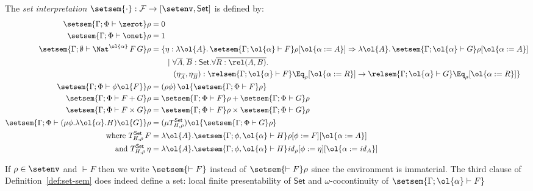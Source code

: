 \documentclass{lmcs}
\theoremstyle{plain}\newtheorem{satz}[thm]{Satz}
\newcommand{\F}{\mathcal{F}}
\newcommand{\set}{\mathsf{Set}}
\renewcommand{\id}{\mathit{id}}
\begin{document}
\begin{defi}\label{def:set-sem}
The {\em set interpretation} $\setsem{\cdot} : \F \to [\setenv, \set]$
is defined by:
\begin{align*}
  \setsem{\Gamma;\Phi \vdash \zerot}\rho &= 0\\
  \setsem{\Gamma;\Phi \vdash \onet}\rho &= 1\\
  \setsem{\Gamma; \emptyset
    \vdash \Nat^{\ol{\alpha}}
    \,F\,G}\rho &= \{\eta : \lambda \ol{A}. \,\setsem{\Gamma;
    \ol{\alpha} \vdash
    F}\rho[\ol{\alpha := A}] 
      \Rightarrow \lambda \ol{A}.\,\setsem{\Gamma; 
        \ol{\alpha} \vdash G}\rho[\ol{\alpha := A}] \\ 
      &\hspace{0.3in}|~\forall \overline{A}, \overline{B} :
      \set. \forall \overline{R : \rel(A, B)}.\\ 
      &\hspace{0.4in}(\eta_{\overline{A}}, \eta_{\overline{B}})
      : \relsem{\Gamma; \ol{\alpha} \vdash F}\Eq_{\rho}[\ol{\alpha := R}]
      \rightarrow \relsem{\Gamma; \ol{\alpha} \vdash
        G}\Eq_{\rho}[\ol{\alpha := R}] \} \\
  \setsem{\Gamma;\Phi \vdash \phi\ol{F}}\rho &=
  (\rho\phi)\,\ol{\setsem{\Gamma;\Phi \vdash
    F}\rho}\\
  \setsem{\Gamma;\Phi \vdash F+G}\rho &=
  \setsem{\Gamma;\Phi \vdash F}\rho +
  \setsem{\Gamma;\Phi \vdash G}\rho\\
  \setsem{\Gamma;\Phi \vdash F\times G}\rho &=
  \setsem{\Gamma;\Phi \vdash F}\rho \times
  \setsem{\Gamma;\Phi \vdash G}\rho\\ 
  \setsem{\Gamma;\Phi \vdash (\mu \phi.\lambda
    \ol{\alpha}. H)\ol{G}}\rho &= (\mu
    T^\set_{H,\rho})\ol{\setsem{\Gamma;\Phi \vdash G}\rho}\\
    \text{where } T^\set_{H,\rho}\,F & = \lambda
  \ol{A}. \setsem{\Gamma;\phi, \ol{\alpha} \vdash
    H}\rho[\phi :=  F][\ol{\alpha := A}]\\
  \text{and } T^\set_{H,\rho}\,\eta &= \lambda
  \ol{A}. \setsem{\Gamma;\phi, \ol{\alpha} \vdash
    H}\id_\rho[\phi := \eta][\ol{\alpha := \id_{A}}]
\end{align*}
\end{defi}
If $\rho \in \setenv$ and $\vdash F$ then we write $\setsem{\vdash F}$
instead of $\setsem{\vdash F}\rho$ since the environment is
immaterial. The third clause of Definition~\ref{def:set-sem} does
indeed define a set: local finite presentability of $\set$ and
$\omega$-cocontinuity of $\setsem{\Gamma;\ol{\alpha} \vdash F}$
\end{document}
